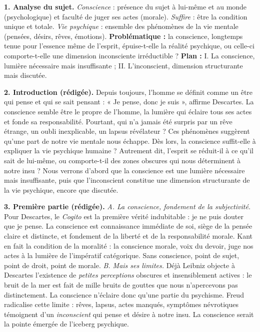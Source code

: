 \documentclass[11pt]{article}
\begin{document}
\begin{corrige}
\textbf{1. Analyse du sujet.} \emph{Conscience} : présence du sujet à lui-même et au monde (psychologique) et faculté de juger ses actes (morale). \emph{Suffire} : être la condition unique et totale. \emph{Vie psychique} : ensemble des phénomènes de la vie mentale (pensées, désirs, rêves, émotions). \textbf{Problématique :} la conscience, longtemps tenue pour l'essence même de l'esprit, épuise-t-elle la réalité psychique, ou celle-ci comporte-t-elle une dimension inconsciente irréductible ? \textbf{Plan :} I. La conscience, lumière nécessaire mais insuffisante ; II. L'inconscient, dimension structurante mais discutée.

\textbf{2. Introduction (rédigée).} Depuis toujours, l'homme se définit comme un être qui pense et qui se sait pensant : « Je pense, donc je suis », affirme Descartes. La conscience semble être le propre de l'homme, la lumière qui éclaire tous ses actes et fonde sa responsabilité. Pourtant, qui n'a jamais été surpris par un rêve étrange, un oubli inexplicable, un lapsus révélateur ? Ces phénomènes suggèrent qu'une part de notre vie mentale nous échappe. Dès lors, la conscience suffit-elle à expliquer la vie psychique humaine ? Autrement dit, l'esprit se réduit-il à ce qu'il sait de lui-même, ou comporte-t-il des zones obscures qui nous déterminent à notre insu ? Nous verrons d'abord que la conscience est une lumière nécessaire mais insuffisante, puis que l'inconscient constitue une dimension structurante de la vie psychique, encore que discutée.

\textbf{3. Première partie (rédigée).} \emph{A. La conscience, fondement de la subjectivité.} Pour Descartes, le \emph{Cogito} est la première vérité indubitable : je ne puis douter que je pense. La conscience est connaissance immédiate de soi, siège de la pensée claire et distincte, et fondement de la liberté et de la responsabilité morale. Kant en fait la condition de la moralité : la conscience morale, voix du devoir, juge nos actes à la lumière de l'impératif catégorique. Sans conscience, point de sujet, point de droit, point de morale. \emph{B. Mais ses limites.} Déjà Leibniz objecte à Descartes l'existence de \emph{petites perceptions} obscures et insensiblement actives : le bruit de la mer est fait de mille bruits de gouttes que nous n'apercevons pas distinctement. La conscience n'éclaire donc qu'une partie du psychisme. Freud radicalise cette limite : rêves, lapsus, actes manqués, symptômes névrotiques témoignent d'un \emph{inconscient} qui pense et désire à notre insu. La conscience serait la pointe émergée de l'iceberg psychique.


\end{corrige}
\end{document}
